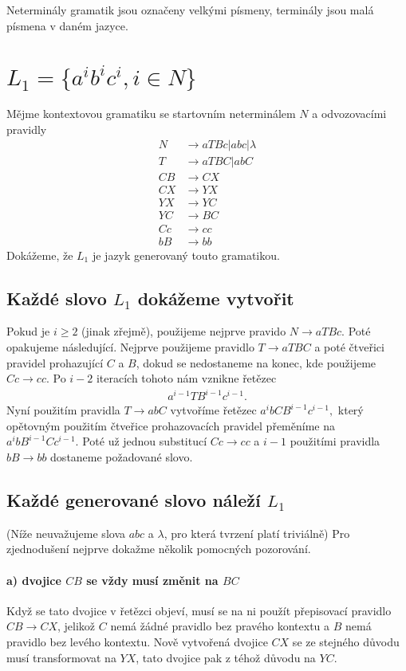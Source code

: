 \documentclass{scrartcl}
\begin{document}
    Neterminály gramatik jsou označeny velkými písmeny, terminály jsou malá písmena v daném jazyce.
    \section{$L_1 = \{a^ib^ic^i, i \in N\}$}
    Mějme kontextovou gramatiku se startovním neterminálem $N$ a odvozovacími pravidly
    \begin{align*}
        N &\rightarrow aTBc \vert abc \vert \lambda \\
        T &\rightarrow aTBC \vert abC \\
        CB &\rightarrow CX \\
        CX &\rightarrow YX \\
        YX &\rightarrow YC \\
        YC &\rightarrow BC \\
        Cc &\rightarrow cc \\
        bB &\rightarrow bb
    \end{align*}
    Dokážeme, že $L_1$ je jazyk generovaný touto gramatikou.

    \subsection{Každé slovo $L_1$ dokážeme vytvořit}
    Pokud je $i \geq 2$ (jinak zřejmě), použijeme nejprve pravido $N \rightarrow aTBc$. Poté opakujeme následující. Nejprve použijeme pravidlo $T \rightarrow aTBC$ a poté čtveřici pravidel prohazující $C$ a $B$, dokud se nedostaneme na konec, kde použijeme $Cc \rightarrow cc$. Po $i-2$ iteracích tohoto nám vznikne řetězec 
    \begin{align*}
        a^{i-1}TB^{i-1}c^{i-1}.
    \end{align*}
    Nyní použitím pravidla $T \rightarrow abC$ vytvoříme řetězec $a^ibCB^{i-1}c^{i-1},$ který opětovným použitím čtveřice prohazovacích pravidel přeměníme na $a^ibB^{i-1}Cc^{i-1}.$ Poté už jednou substitucí $Cc \rightarrow cc$ a $i-1$ použitími pravidla $bB \rightarrow bb$ dostaneme požadované slovo.

    \subsection{Každé generované slovo náleží $L_1$} (Níže neuvažujeme slova $abc$ a $\lambda$, pro která tvrzení platí triviálně)
    Pro zjednodušení nejprve dokažme několik pomocných pozorování.

    \paragraph{a) dvojice $CB$ se vždy musí změnit na $BC$}
    Když se tato dvojice v řetězci objeví, musí se na ni použít přepisovací pravidlo $CB \rightarrow CX$, jelikož $C$ nemá žádné pravidlo bez pravého kontextu a $B$ nemá pravidlo bez levého kontextu. Nově vytvořená dvojice $CX$ se ze stejného důvodu musí transformovat na $YX$, tato dvojice pak z téhož důvodu na $YC$.
    
\end{document}
